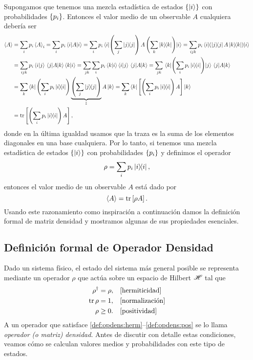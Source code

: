 \documentclass[10pt, a4paper]{article}
\numberwithin{equation}{subsection}
\begin{document}
Supongamos que tenemos una mezcla estadística de estados $\set{\ket{i}}$ con
probabilidades $\set{p_i}$. Entonces el valor medio de un observable $A$
cualquiera debería ser
\begin{align}
  \expval{A}
  &= \sum_i p_i \expval{A}_{i}
  = \sum_i p_i \expval{A}{i}
  = \sum_i p_i \matrixel{i}{\left(\sum_j\projector{j}\right) A
    \left(\sum_k\projector{k}\right)}{i}
  = \sum_{ijk} p_i \matrixel{i}{\left(\projector{j} A \projector{k}\right)}{i}
    \nonumber \\
  &= \sum_{ijk} p_i \braket{i}{j} \matrixel{j}{A}{k} \braket{k}{i}
  = \sum_{jk} \sum_i p_i \braket{k}{i} \braket{i}{j} \matrixel{j}{A}{k}
  = \sum_{jk} \matrixel{k}{\left(\sum_i p_i \projector{i}\right)}{j}
    \matrixel{j}{A}{k} \nonumber \\
  &= \sum_{k} \bra{k}\left(\sum_i p_i \projector{i}\right)
    \underbrace{\left(\sum_j\projector{j}\right)}_{\Id} A\ket{k}
  = \sum_{k} \bra{k}\left[\left(\sum_i p_i \projector{i}\right)
    A\right]\ket{k} \nonumber \\
  &= \tr\left[\left(\sum_i p_i \projector{i}\right) A\right],
\end{align}
donde en la última igualdad usamos que la traza es la suma de los elementos
diagonales en una base cualquiera.
Por lo tanto, si tenemos una mezcla estadística de estados $\set{\ket{i}}$ con
probabilidades $\set{p_i}$ y definimos el operador
\begin{equation}
  \rho = \sum_i p_i \projector{i},
\end{equation}
entonces el valor medio de un observable $A$ está dado por
\begin{equation}
  \expval{A} = \tr\left[\rho A\right].
\end{equation}
Usando este razonamiento como inspiración a continuación damos la definición
formal de matriz densidad y mostramos algunas de sus propiedades esenciales.

\subsection{Definición formal de Operador Densidad}
Dado un sistema físico, el estado del sistema más general posible se representa
mediante un operador $\rho$ que actúa sobre un espacio de Hilbert $\mathscr{H}$
tal que
\begin{align}
  \rho^\dagger &= \rho, & &\text{[hermiticidad]}\label{def:opdens:herm} \\
  \tr\rho &= 1, & &\text{[normalización]} \label{def:opdens:tr} \\
  \rho &\geq 0. & &\text{[positividad]} \label{def:opdens:pos}
\end{align}
A un operador que satisface \eqref{def:opdens:herm}--\eqref{def:opdens:pos} se
lo llama \emph{operador (o matriz) densidad}. Antes de discutir con detalle
estas condiciones, veamos cómo se calculan valores medios y probabilidades con
este tipo de estados.
\end{document}
